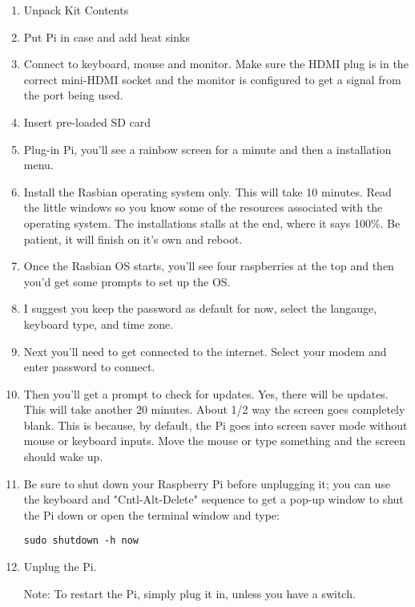 \documentclass{article}\usepackage[]{graphicx}\usepackage[]{color}
\begin{document}
\begin{enumerate}

\item Unpack Kit Contents
\item Put Pi in case and add heat sinks
\item Connect to keyboard, mouse and monitor. Make sure the HDMI plug is in the correct mini-HDMI socket and the monitor is configured to get a signal from the port being used. 
\item Insert pre-loaded SD card
\item Plug-in Pi, you'll see a rainbow screen for a minute and then a installation menu. 
\item Install the Rasbian operating system only. This will take 10 minutes. Read the little windows so you know some of the resources associated with the operating system. The installations stalls at the end, where it says 100\%. Be patient, it will finish on it's own and reboot.

\item Once the Rasbian OS starts, you'll see four raspberries at the top and then you'd get some prompts to set up the OS. 

\item I suggest you keep the password as default for now, select the langauge, keyboard type, and time zone. 

\item Next you'll need to get connected to the internet. Select your modem and enter password to connect.

\item Then you'll get a prompt to check for updates. Yes, there will be updates. This will take another 20 minutes. About 1/2 way the screen goes completely blank. This is because, by default, the Pi goes into screen saver mode without mouse or keyboard inputs. Move the mouse or type something and the screen should wake up. 

\item Be sure to shut down your Raspberry Pi before unplugging it; you can use the keyboard and "Cntl-Alt-Delete" sequence to get a pop-up window to shut the Pi down or open the terminal window and type:

\begin{lstlisting}
sudo shutdown -h now
\end{lstlisting}

\item Unplug the Pi.

Note: To restart the Pi, simply plug it in, unless you have a switch. 

\end{enumerate}
\end{document}
